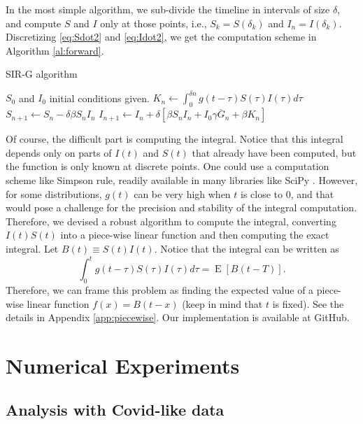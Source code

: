 \documentclass[USenglish,10pt]{article}
\newcommand{\Gb}{\overline{G}\xspace}
\DeclareMathOperator{\Exp}{E}       %
\newcommand{\E}[1]{\Exp\left[{#1}\right]}       %
\begin{document}
In the most simple algorithm, we sub-divide the timeline in intervals of size $\delta$, and compute $S$ and $I$ only at those points, i.e., $S_k=S(\delta_k)$ and $I_n=I(\delta_k)$. Discretizing \eqref{eq:Sdot2} and \eqref{eq:Idot2}, we get the computation scheme in Algorithm \ref{al:forward}.

\begin{algorithm}[ht]
    \caption{SIR-G algorithm}
    \label{al:simple}
    \begin{algorithmic}[1] %
		\State	$S_0$ and $I_0$  initial conditions given.
			\State $K_n \gets \int_0^{\delta n} g(t-\tau) S(\tau)I(\tau)d\tau$
			\State $S_{n+1} \gets  S_n - \delta\beta S_n I_n$
			\State $I_{n+1} \gets  I_n + \delta\left[\beta S_n I_n + I_0\gamma\Gb_n + \beta K_n\right]$
		\EndFor
    \end{algorithmic}
    \label{al:forward}
\end{algorithm}


Of course, the difficult part is computing the integral. Notice that this integral depends only on parts of $I(t)$ and $S(t)$ that already have been computed, but the function is only known at discrete points.
One could use a computation scheme like Simpson rule, readily available in many libraries like SciPy \cite{jon.ea.01}. However, for some distributions, $g(t)$ can be very high when $t$ is close to $0$, and that would pose a challenge for the precision and stability of the integral computation.
Therefore, we devised a robust algorithm to compute the integral, converting $I(t)S(t)$ into a piece-wise linear function and then computing the exact integral. Let $B(t)\equiv S(t)I(t)$. Notice that the integral can be written as
\[ \int_0^{t} g(t-\tau) S(\tau)I(\tau)d\tau = \E{B(t-T)}.  \]
Therefore, we can frame this problem as finding the expected value of a piece-wise linear function $f(x)=B(t-x)$ (keep in mind that $t$ is fixed). See the details in Appendix \ref{app:piecewise}. Our implementation is available at GitHub\cite{rian20}.

\section{Numerical Experiments}\label{sc:numerical}

\subsection{Analysis with Covid-like data}
\end{document}
